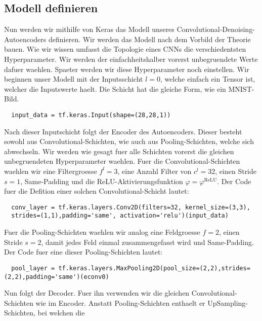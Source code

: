 \subsection{Modell definieren}
Nun werden wir mithilfe von Keras das Modell unseres
Convolutional-Denoising-Autoencoders definieren.
Wir werden das Modell nach dem Vorbild der Theorie bauen.
Wie wir wissen umfasst die Topologie eines CNNs die verschiedentsten
Hyperparameter. Wir werden der einfachheitshalber vorerst unbegruendete Werte
dafuer waehlen. Spaeter werden wir diese Hyperparameter noch einstellen.
\para{}
Wir beginnen unser Modell mit der Inputsschicht $l=0$, welche einfach ein Tensor
ist, welcher die Inputswerte haelt. Die Schicht hat die gleiche Form, wie ein MNIST-Bild.
\begin{verbatim}
  input_data = tf.keras.Input(shape=(28,28,1))
\end{verbatim}
\para{}
Nach dieser Inputschicht folgt der Encoder des Autoencoders. Dieser besteht
sowohl aus Convolutional-Schichten, wie auch aus Pooling-Schichten, welche sich abwechseln.
Wir werden wie gesagt fuer alle Schichten vorerst die gleichen unbegruendeten
Hyperparameter waehlen. Fuer die Convolutional-Schichten waehlen wir
eine Filtergroesse $f^l = 3$, eine Anzahl Filter von $c^l = 32$,
einen Stride $s=1$, Same-Padding und die ReLU-Aktivierungsfunktion $\varphi = \varphi^{\text{ReLU}}$.
Der Code fuer die Defition einer solchen Convolutional-Schicht lautet:
\begin{verbatim}
  conv_layer = tf.keras.layers.Conv2D(filters=32, kernel_size=(3,3),
  strides=(1,1),padding='same', activation='relu')(input_data)
\end{verbatim}
Fuer die Pooling-Schichten waehlen wir analog eine Feldgroesse $f = 2$, einen
Stride $s = 2$, damit jedes Feld einmal zusammengefasst wird und Same-Padding.
Der Code fuer eine dieser Pooling-Schichten lautet:
\begin{verbatim}
  pool_layer = tf.keras.layers.MaxPooling2D(pool_size=(2,2),strides=(2,2),padding='same')(econv0)
\end{verbatim}
Nun folgt der Decoder.
Fuer ihn verwenden wir die gleichen Convolutional-Schichten wie im Encoder. Anstatt
Pooling-Schichten enthaelt er UpSampling-Schichten, bei welchen die
